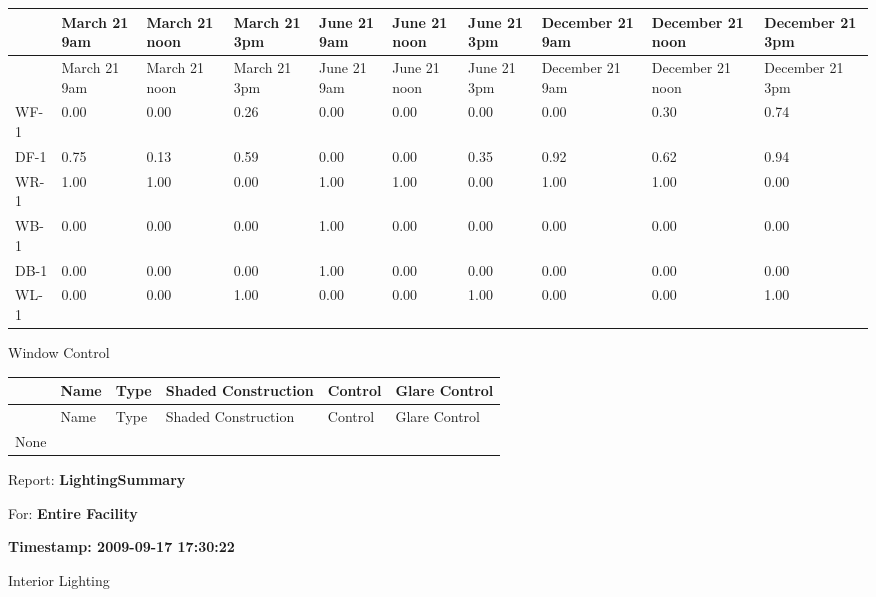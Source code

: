 {\scriptsize
\begin{longtable}[c]{>{\raggedright}p{0.6in}>{\raggedright}p{0.5in}>{\raggedright}p{0.5in}>{\raggedright}p{0.5in}>{\raggedright}p{0.5in}>{\raggedright}p{0.5in}>{\raggedright}p{0.5in}>{\raggedright}p{0.5in}>{\raggedright}p{0.5in}>{\raggedright}p{0.5in}}
\toprule
~ & March 21 9am & March 21 noon & March 21 3pm & June 21 9am & June 21 noon & June 21 3pm & December 21 9am & December 21 noon & December 21 3pm \tabularnewline
\midrule
\endfirsthead

\toprule
~ & March 21 9am & March 21 noon & March 21 3pm & June 21 9am & June 21 noon & June 21 3pm & December 21 9am & December 21 noon & December 21 3pm \tabularnewline
\midrule
\endhead

WF-1 & 0.00 & 0.00 & 0.26 & 0.00 & 0.00 & 0.00 & 0.00 & 0.30 & 0.74 \tabularnewline
DF-1 & 0.75 & 0.13 & 0.59 & 0.00 & 0.00 & 0.35 & 0.92 & 0.62 & 0.94 \tabularnewline
WR-1 & 1.00 & 1.00 & 0.00 & 1.00 & 1.00 & 0.00 & 1.00 & 1.00 & 0.00 \tabularnewline
WB-1 & 0.00 & 0.00 & 0.00 & 1.00 & 0.00 & 0.00 & 0.00 & 0.00 & 0.00 \tabularnewline
DB-1 & 0.00 & 0.00 & 0.00 & 1.00 & 0.00 & 0.00 & 0.00 & 0.00 & 0.00 \tabularnewline
WL-1 & 0.00 & 0.00 & 1.00 & 0.00 & 0.00 & 1.00 & 0.00 & 0.00 & 1.00 \tabularnewline
\bottomrule
\end{longtable}}

Window Control

\begin{longtable}[c]{@{}llllll@{}}
\toprule
~ & Name & Type & Shaded Construction & Control & Glare Control \tabularnewline
\midrule
\endfirsthead

\toprule
~ & Name & Type & Shaded Construction & Control & Glare Control \tabularnewline
\midrule
\endhead

None & ~ & ~ & ~ & ~ & ~ \tabularnewline
\bottomrule
\end{longtable}

Report: \textbf{LightingSummary}

For: \textbf{Entire Facility}

\textbf{Timestamp: 2009-09-17 17:30:22}

Interior Lighting

